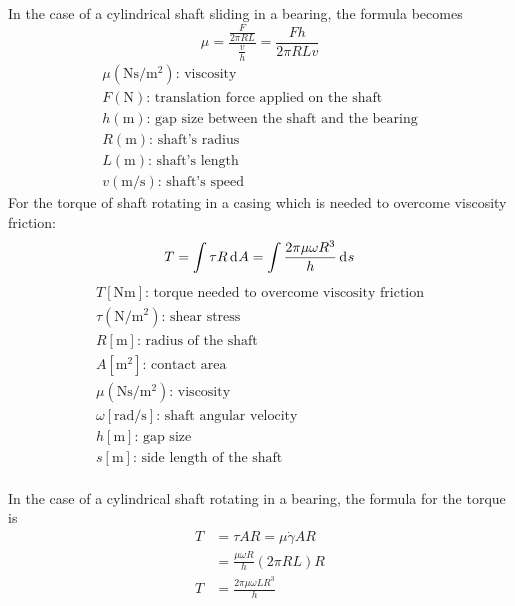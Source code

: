 \documentclass[10pt, twocolumn]{article}
\begin{document}
In the case of a cylindrical shaft sliding in a bearing, the formula becomes
\[
  \mu = \frac{\frac{F}{2 \pi R L}}{\frac{v}{h}} = \frac{F h}{2 \pi R L v}
\]
\[
  \begin{array}{|l}
    \mu (\si{\newton\second\per\metre\squared}) \text{: viscosity}      \\
    F (\si{\newton}) \text{: translation force applied on the shaft}    \\
    h (\si{\metre}) \text{: gap size between the shaft and the bearing} \\
    R (\si{\metre}) \text{: shaft's radius}                             \\
    L (\si{\metre}) \text{: shaft's length}                             \\
    v (\si{\metre\per\second}) \text{: shaft's speed}
  \end{array}
\]
For the torque of shaft rotating in a casing which is needed to overcome viscosity friction:
\begin{align*}
  T = \int{\tau R \,\mathrm{d}^{} A} = \int{\frac{2 \pi \mu \omega R^3}{h} \,\mathrm{d}^{} s}
\end{align*}
\[
  \begin{array}{|l}
    T [\si{\newton\metre}] \text{: torque needed to overcome viscosity friction} \\
    \tau (\si{\newton\per\metre\squared}) \text{: shear stress}                  \\
    R [\si{\metre}] \text{: radius of the shaft}                                 \\
    A [\si{\metre\squared}] \text{: contact area}                                \\
    \mu (\si{\newton\second\per\metre\squared}) \text{: viscosity}               \\
    \omega [\si{\radian\per\second}] \text{: shaft angular velocity}             \\
    h [\si{\metre}] \text{: gap size}                                            \\
    s [\si{\metre}] \text{: side length of the shaft}                            \\
  \end{array}
\]

In the case of a cylindrical shaft rotating in a bearing, the formula for the torque is
\begin{align*}
  T & = \tau A R = \mu \dot{\gamma} A R     \\
    & = \frac{\mu\omega R}{h} (2 \pi R L) R \\
  T & = \frac{2 \pi \mu \omega L R^3}{h}
\end{align*}
\end{document}
